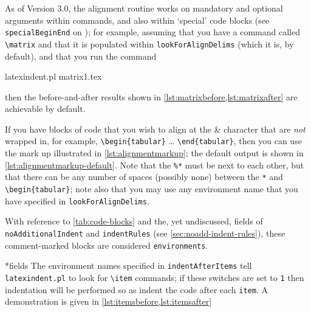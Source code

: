 	As of Version 3.0, the alignment routine works on mandatory and optional arguments within
	commands, and also within `special' code blocks (see \texttt{specialBeginEnd} on
	); for example, assuming that you have a command called
	\lstinline!\matrix! and that it is populated within \texttt{lookForAlignDelims} (which it is, by default), and that
	you run the command
	\begin{commandshell}
latexindent.pl matrix1.tex 
    \end{commandshell}
	then the before-and-after results shown in \cref{lst:matrixbefore,lst:matrixafter} are achievable by
	default.

        \begin{cmhtcbraster}
        \end{cmhtcbraster}

	If you have blocks of code that you wish to align at the \&  character that are
	\emph{not} wrapped in, for example, \lstinline!\begin{tabular}! \ldots
	\lstinline!\end{tabular}!, then you can use the mark up illustrated in
	\cref{lst:alignmentmarkup}; the default output is shown in \cref{lst:alignmentmarkup-default}. Note
	that the \lstinline!%*! must be next to each other, but that there can be any
	number of spaces (possibly none) between the
	\lstinline!*! and \lstinline!\begin{tabular}!; note also that you may use any
	environment name that you have specified in \texttt{lookForAlignDelims}.

        \begin{cmhtcbraster}
        \end{cmhtcbraster}

	With reference to \vref{tab:code-blocks} and the, yet undiscussed, fields of
	\texttt{noAdditionalIndent} and \texttt{indentRules}
	(see \vref{sec:noadd-indent-rules}), these comment-marked blocks are
	considered \texttt{environments}.

*{fields}
	The environment names specified in \texttt{indentAfterItems}  tell \texttt{latexindent.pl}
	to look for \lstinline!\item! commands; if these switches are set to
	\texttt{1} then indentation will be performed so as indent the code after
	each \texttt{item}. A demonstration is given in \cref{lst:itemsbefore,lst:itemsafter}

